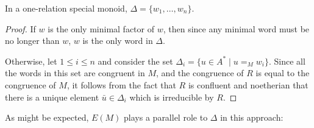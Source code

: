 \documentclass[noindex,noinsetproof,emphthm,12pt]{lmaths}
\begin{document}
\begin{lemma}
	In a one-relation special monoid, $\Delta = \{w_1, \ldots, w_n\}$. \incomplete
\end{lemma}
\begin{proof}
	If $w$ is the only minimal factor of $w$, then since any minimal word must be no longer than $w$, $w$ is the only word in $\Delta$.

	Otherwise, let $1 \le i \le n$ and consider the set $\Delta_i = \{ u \in A^* \mid u =_M w_i \}$. Since all the words in this set are congruent in $M$, and the congruence of $R$ is equal to the congruence of $M$, it follows from the fact that $R$ is confluent and noetherian that there is a unique element $\bar u \in \Delta_i$ which is irreducible by $R$.
\end{proof}

As might be expected, $E(M)$ plays a parallel role to $\Delta$ in this approach:
\end{document}
